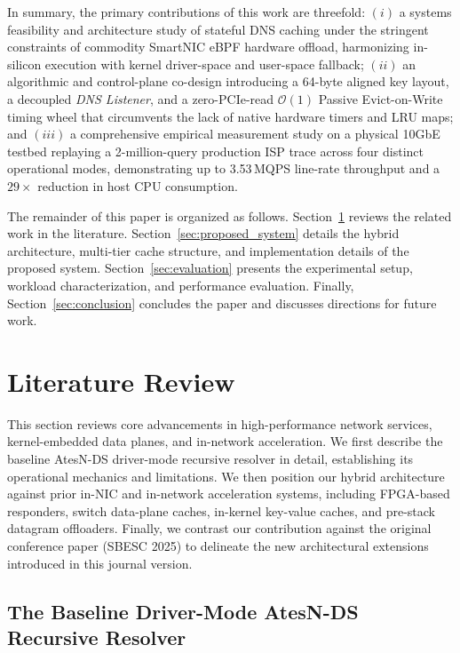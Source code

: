 \documentclass[a4paper,fleqn,colorlinks,hidelinks]{cas-sc}
\begin{document}
In summary, the primary contributions of this work are threefold: $(i)$ a systems feasibility and architecture study of stateful DNS caching under the stringent constraints of commodity SmartNIC eBPF hardware offload, harmonizing in-silicon execution with kernel driver-space and user-space fallback; $(ii)$ an algorithmic and control-plane co-design introducing a 64-byte aligned key layout, a decoupled \textit{DNS Listener}, and a zero-PCIe-read $\mathcal{O}(1)$ Passive Evict-on-Write timing wheel that circumvents the lack of native hardware timers and LRU maps; and $(iii)$ a comprehensive empirical measurement study on a physical 10GbE testbed replaying a 2-million-query production ISP trace across four distinct operational modes, demonstrating up to 3.53\,MQPS line-rate throughput and a $29\times$ reduction in host CPU consumption.

The remainder of this paper is organized as follows. Section~\ref{sec:related_work} reviews the related work in the literature. Section~\ref{sec:proposed_system} details the hybrid architecture, multi-tier cache structure, and implementation details of the proposed system. Section~\ref{sec:evaluation} presents the experimental setup, workload characterization, and performance evaluation. Finally, Section~\ref{sec:conclusion} concludes the paper and discusses directions for future work.

\section{Literature Review}
\label{sec:related_work}

This section reviews core advancements in high-performance network services, kernel-embedded data planes, and in-network acceleration. We first describe the baseline AtesN-DS driver-mode recursive resolver in detail, establishing its operational mechanics and limitations. We then position our hybrid architecture against prior in-NIC and in-network acceleration systems, including FPGA-based responders, switch data-plane caches, in-kernel key-value caches, and pre-stack datagram offloaders. Finally, we contrast our contribution against the original conference paper (SBESC 2025) to delineate the new architectural extensions introduced in this journal version.

\subsection{The Baseline Driver-Mode AtesN-DS Recursive Resolver}
\label{sec:driver_mode_resolver}
\end{document}
